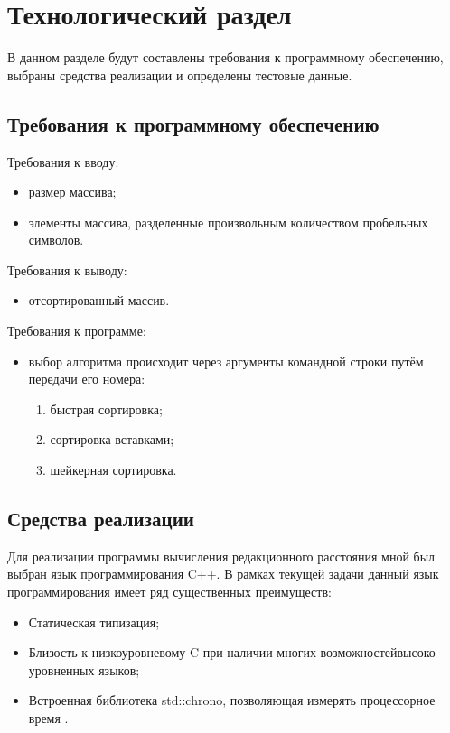 \chapter{Технологический раздел}
\label{cha:impl}

В данном разделе будут составлены требования к программному обеспечению, выбраны средства реализации и определены тестовые данные.

\section{Требования к программному обеспечению}
Требования к вводу:
\begin{itemize}
    \item размер массива;
    \item элементы массива, разделенные произвольным количеством пробельных символов.
\end{itemize}

Требования к выводу:
\begin{itemize}
    \item отсортированный массив.
\end{itemize}

Требования к программе:
\begin{itemize}
    \item выбор алгоритма происходит через аргументы командной строки путём передачи его номера:
        \begin{enumerate}[1)]
            \item быстрая сортировка;
            \item сортировка вставками;
            \item шейкерная сортировка.
        \end{enumerate}

\end{itemize}

\section{Средства реализации}
Для реализации программы вычисления редакционного расстояния мной был выбран язык программирования C++. В рамках текущей задачи данный язык программирования имеет ряд существенных преимуществ:
\begin{itemize}
    \item Статическая типизация;
    \item Близость к низкоуровневому C при наличии многих возможностейвысоко уровненных языков;
    \item Встроенная библиотека std::chrono, позволяющая измерять процессорное время \cite{chrono}.
\end{itemize}

